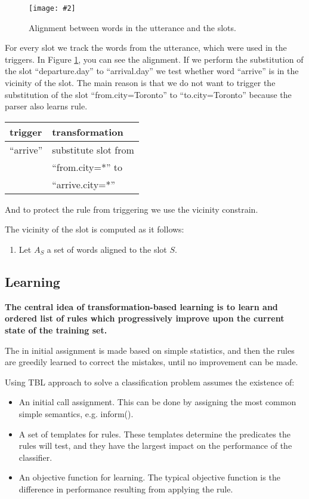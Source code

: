 \documentclass[11pt]{article}
\newcommand{\fgrparam}[4]{
  \begin{figure}[htbp]
    \begin{center}
      \leavevmode
      \texttt{[image: \#2]}
    \end{center}
    \caption{#4}
    \label{#3}
  \end{figure}
}
\begin{document}
\fgrparam{width=8cm}{./fig/words-slots-alignment.pdf}{fig:alignment}{Alignment between words in the utterance and the slots.}

For every slot we track the words from the utterance, which were used in the triggers. In Figure \ref{fig:alignment}, you can see the alignment. If we perform the substitution of the slot ``departure.day'' to ``arrival.day'' we test whether word ``arrive'' is in the vicinity of the slot. The main reason is that we do not want to trigger the substitution of the slot ``from.city=Toronto'' to ``to.city=Toronto'' because the parser also learns rule.

\vspace{.25cm}
\begin{tabular}{ll}
  trigger & transformation \\
  \hline 
  ``arrive''            & substitute slot from\\
                        & ``from.city=*'' to \\
                        & ``arrive.city=*'' \\
\end{tabular} 
\vspace{.25cm}

And to protect the rule from triggering we use the vicinity constrain.

The vicinity of the slot is computed as it follows:

\begin{enumerate}
  \item Let $A_S$ a set of words aligned to the slot $S$.
\end{enumerate}


\subsection{Learning} \label{sec:tbl:learning}
\textbf{The central idea of transformation-based learning is to learn and ordered list of rules which progressively improve upon the current state of the training set.} 

The in initial assignment is made based on simple statistics, and then the rules are greedily learned to correct the mistakes, until no improvement can be made.

Using TBL approach to solve a classification problem assumes the existence of:


\begin{itemize}
  \item An initial call assignment. This can be done by assigning the most common simple semantics, e.g. inform().
  \item A set of templates for rules. These templates determine the predicates the rules will test, and they have the largest impact on the performance of the classifier.
  \item An objective function for learning. The typical objective function is the difference in performance resulting from applying the rule.
\end{itemize}
\end{document}
